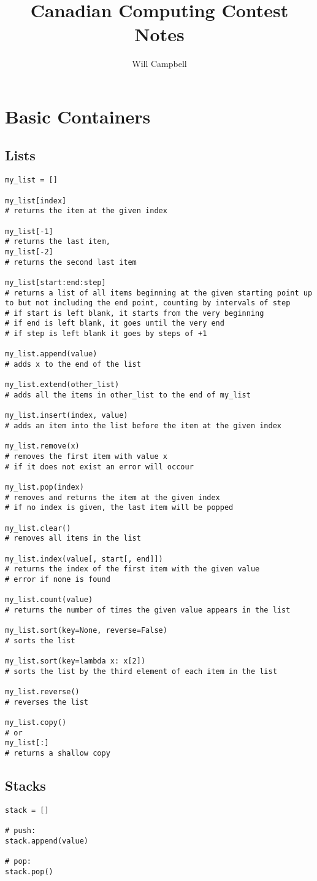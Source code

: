 \documentclass[12pt]{article}
\title{Canadian Computing Contest Notes}
\author{Will Campbell}
\begin{document}
\section{Basic Containers}
\subsection{Lists}
\begin{lstlisting}
my_list = []

my_list[index]
# returns the item at the given index

my_list[-1]
# returns the last item,
my_list[-2]
# returns the second last item

my_list[start:end:step]
# returns a list of all items beginning at the given starting point up to but not including the end point, counting by intervals of step
# if start is left blank, it starts from the very beginning
# if end is left blank, it goes until the very end
# if step is left blank it goes by steps of +1

my_list.append(value)
# adds x to the end of the list

my_list.extend(other_list)
# adds all the items in other_list to the end of my_list

my_list.insert(index, value)
# adds an item into the list before the item at the given index

my_list.remove(x)
# removes the first item with value x
# if it does not exist an error will occour

my_list.pop(index)
# removes and returns the item at the given index
# if no index is given, the last item will be popped

my_list.clear()
# removes all items in the list

my_list.index(value[, start[, end]])
# returns the index of the first item with the given value
# error if none is found

my_list.count(value)
# returns the number of times the given value appears in the list

my_list.sort(key=None, reverse=False)
# sorts the list

my_list.sort(key=lambda x: x[2])
# sorts the list by the third element of each item in the list

my_list.reverse()
# reverses the list

my_list.copy()
# or
my_list[:]
# returns a shallow copy
\end{lstlisting}

\subsection{Stacks}
\begin{lstlisting}
stack = []

# push:
stack.append(value)

# pop:
stack.pop()
\end{lstlisting}
\end{document}
